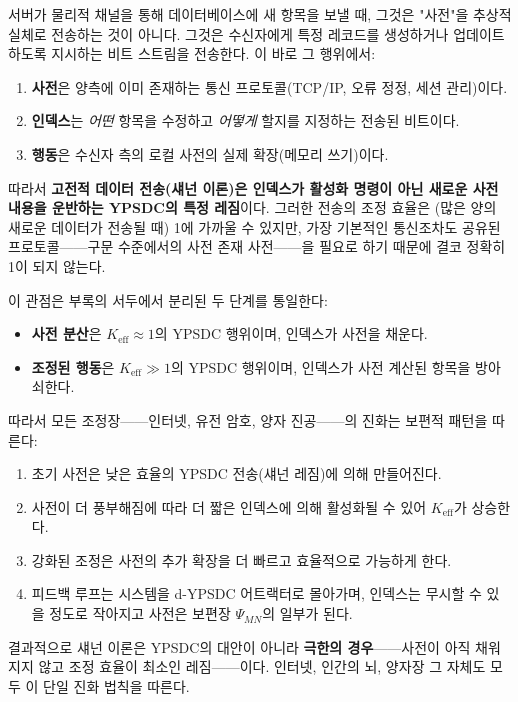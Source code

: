 \documentclass[12pt,a4paper]{article}
\begin{document}
	서버가 물리적 채널을 통해 데이터베이스에 새 항목을 보낼 때, 그것은 "사전"을 추상적 실체로 전송하는 것이 아니다. 그것은 수신자에게 특정 레코드를 생성하거나 업데이트하도록 지시하는 비트 스트림을 전송한다. 이 바로 그 행위에서:
	
	\begin{enumerate}[leftmargin=*]
		\item \textbf{사전}은 양측에 이미 존재하는 통신 프로토콜(TCP/IP, 오류 정정, 세션 관리)이다.
		\item \textbf{인덱스}는 \emph{어떤} 항목을 수정하고 \emph{어떻게} 할지를 지정하는 전송된 비트이다.
		\item \textbf{행동}은 수신자 측의 로컬 사전의 실제 확장(메모리 쓰기)이다.
	\end{enumerate}
	
	따라서 \textbf{고전적 데이터 전송(섀넌 이론)은 인덱스가 활성화 명령이 아닌 새로운 사전 내용을 운반하는 YPSDC의 특정 레짐}이다. 그러한 전송의 조정 효율은 (많은 양의 새로운 데이터가 전송될 때) 1에 가까울 수 있지만, 가장 기본적인 통신조차도 공유된 프로토콜——구문 수준에서의 사전 존재 사전——을 필요로 하기 때문에 결코 정확히 1이 되지 않는다.
	
	이 관점은 부록의 서두에서 분리된 두 단계를 통일한다:
	
	\begin{itemize}[leftmargin=*]
		\item \textbf{사전 분산}은 $K_{\mathrm{eff}} \approx 1$의 YPSDC 행위이며, 인덱스가 사전을 채운다.
		\item \textbf{조정된 행동}은 $K_{\mathrm{eff}} \gg 1$의 YPSDC 행위이며, 인덱스가 사전 계산된 항목을 방아쇠한다.
	\end{itemize}
	
	따라서 모든 조정장——인터넷, 유전 암호, 양자 진공——의 진화는 보편적 패턴을 따른다:
	\begin{enumerate}[leftmargin=*]
		\item 초기 사전은 낮은 효율의 YPSDC 전송(섀넌 레짐)에 의해 만들어진다.
		\item 사전이 더 풍부해짐에 따라 더 짧은 인덱스에 의해 활성화될 수 있어 $K_{\mathrm{eff}}$가 상승한다.
		\item 강화된 조정은 사전의 추가 확장을 더 빠르고 효율적으로 가능하게 한다.
		\item 피드백 루프는 시스템을 d-YPSDC 어트랙터로 몰아가며, 인덱스는 무시할 수 있을 정도로 작아지고 사전은 보편장 $\Psi_{MN}$의 일부가 된다.
	\end{enumerate}
	
	결과적으로 섀넌 이론은 YPSDC의 대안이 아니라 \textbf{극한의 경우}——사전이 아직 채워지지 않고 조정 효율이 최소인 레짐——이다. 인터넷, 인간의 뇌, 양자장 그 자체도 모두 이 단일 진화 법칙을 따른다.
	
\end{document}
